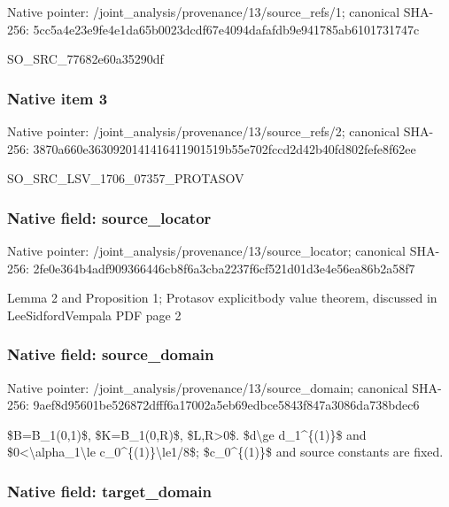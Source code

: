 \documentclass[10pt,a4paper]{article}
\begin{document}
Native pointer: /joint\_analysis/provenan\allowbreak{}ce/13/source\_refs/1; canonical SHA-256: 5cc5a4e23e9fe4e1da65b002\allowbreak{}3dcdf67e4094dafafdb9e941\allowbreak{}785ab6101731747c


SO\_SRC\_77682e60a35290df


\subsubsection{Native item 3}


Native pointer: /joint\_analysis/provenan\allowbreak{}ce/13/source\_refs/2; canonical SHA-256: 3870a660e363092014141641\allowbreak{}1901519b55e702fccd2d42b4\allowbreak{}0fd802fefe8f62ee


SO\_SRC\_LSV\_1706\_07357\_PROTASOV


\subsubsection{Native field: source\_locator}


Native pointer: /joint\_analysis/provenan\allowbreak{}ce/13/source\_locator; canonical SHA-256: 2fe0e364b4adf909366446cb\allowbreak{}8f6a3cba2237f6cf521d01d3\allowbreak{}e4e56ea86b2a58f7


Lemma 2 and Proposition 1; Protasov explicitbody value theorem, discussed in LeeSidfordVempala PDF page 2


\subsubsection{Native field: source\_domain}


Native pointer: /joint\_analysis/provenan\allowbreak{}ce/13/source\_domain; canonical SHA-256: 9aef8d95601be526872dfff6\allowbreak{}a17002a5eb69edbce5843f84\allowbreak{}7a3086da738bdec6


\$B=B\_1(0,1)\$, \$K=B\_1(0,R)\$, \$L,R>0\$. \$d\textbackslash{}ge d\_1\textasciicircum{}\{(1)\}\$ and \$0<\textbackslash{}alpha\_1\textbackslash{}le c\_0\textasciicircum{}\{(1)\}\textbackslash{}le1/8\$; \$c\_0\textasciicircum{}\{(1)\}\$ and source constants are fixed.


\subsubsection{Native field: target\_domain}
\end{document}
